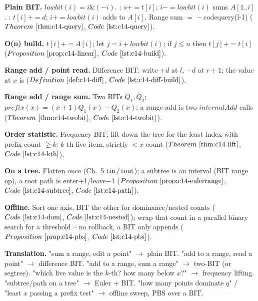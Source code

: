 \begin{quickref}
\textbf{Plain BIT.} \(\mathit{lowbit}(i)=i\&(-i)\).
: \(s\!+=\!t[i];\,i-=\!\mathit{lowbit}(i)\) sums \(A[1..i]\).
: \(t[i]\!+=\!d;\,i+=\!\mathit{lowbit}(i)\) adds to \(A[i]\).
Range sum \(=\) \(-\,\)code{query(l-1)}
(\(\thmref{c14-query}\), \(\coderef{c14-query}\)).

\medskip
\textbf{O(n) build.} \(t[i]+=\!A[i]\); let \(j=i+\mathit{lowbit}(i)\); if
\(j\le n\) then \(t[j]+=\!t[i]\) (\(\propref{c14-linear}\), \(\coderef{c14-build}\)).

\medskip
\textbf{Range add / point read.} Difference BIT: write \(+d\) at \(l\), \(-d\) at
\(r{+}1\); the value at \(x\) is 
(\(\defref{c14-diff}\), \(\coderef{c14-diff-build}\)).

\medskip
\textbf{Range add / range sum.} Two BITs \(Q_1,Q_2\); \(\mathit{prefix}(x)=(x{+}1)Q_1(x)-Q_2(x)\);
a range add is two \(\mathit{internalAdd}\) calls
(\(\thmref{c14-twobit}\), \(\coderef{c14-twobit}\)).

\medskip
\textbf{Order statistic.} Frequency BIT; lift down the tree for the least index
with prefix count \(\ge k\): \(k\)-th live item, strictly-\(<x\) count
(\(\thmref{c14-lift}\), \(\coderef{c14-kth}\)).

\medskip
\textbf{On a tree.} Flatten once (Ch.~5 \(\operatorname{tin}/\operatorname{tout}\)); a subtree is an interval
(BIT range op), a root path is enter\(+\)1/leave\(-\)1
(\(\propref{c14-eulerrange}\), \(\coderef{c14-subtree}\), \(\coderef{c14-path}\)).

\medskip
\textbf{Offline.} Sort one axis, BIT the other for dominance/nested counts
(\(\coderef{c14-dom}\), \(\coderef{c14-nested}\)); wrap that count in a parallel
binary search for a threshold -- no rollback, a BIT only appends
(\(\propref{c14-pbs}\), \(\coderef{c14-pbs}\)).

\medskip
\textbf{Translation.} "sum a range, edit a point" \(\to\) plain BIT. "add to a
range, read a point" \(\to\) difference BIT. "add to a range, sum a range" \(\to\)
two-BIT (or segtree). "which live value is the \(k\)-th? how many below \(x\)?"
\(\to\) frequency lifting. "subtree/path on a tree" \(\to\) Euler \(+\) BIT.
"how many points dominate \(q\)" / "least \(x\) passing a prefix test" \(\to\)
offline sweep, PBS over a BIT.
\end{quickref}

